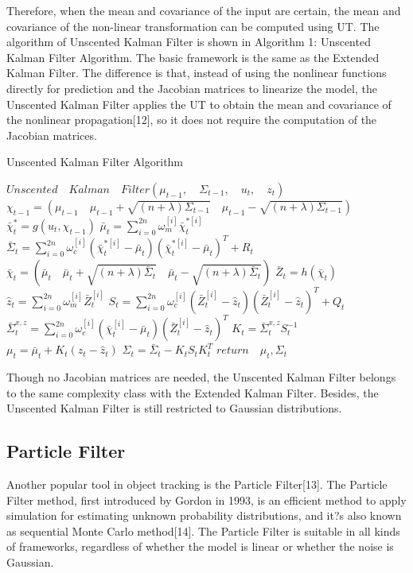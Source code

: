 \documentclass[10pt,twocolumn,letterpaper]{article}
\begin{document}
Therefore, when the mean and covariance of the input are certain, the mean and covariance of the non-linear transformation can be computed using UT. The algorithm of Unscented Kalman Filter is shown in Algorithm 1: Unscented Kalman Filter Algorithm. The basic framework is the same as the Extended Kalman Filter. The difference is that, instead of using the nonlinear functions directly for prediction and the Jacobian matrices to linearize the model, the Unscented Kalman Filter applies the UT to obtain the mean and covariance of the nonlinear propagation[12], so it does not require the computation of the Jacobian matrices.
\begin{algorithm}
\caption {Unscented Kalman Filter Algorithm}
\begin{algorithmic} [1]
\State  $Unscented\quad Kalman\quad Filter(\mu_{t-1},\quad \Sigma_{t-1},\quad u_t,\quad z_t)$
\State $\chi_{t-1}=(\mu_{t-1} \quad \mu_{t-1}+\sqrt{(n+\lambda)\Sigma_{t-1}} \quad \mu_{t-1}-\sqrt{(n+\lambda)\Sigma_{t-1}})$
\State $\bar\chi_t^*=g(u_t,\chi_{t-1})$
\State $\bar\mu_t=\sum_{i=0}^{2n} \omega_m^{[i]}\bar\chi_t^{*[i]}$
\State $\bar\Sigma_t=\sum_{i=0}^{2n} \omega_c^{[i]}(\bar\chi_t^{*[i]}-\bar\mu_t)(\bar\chi_t^{*[i]}-\bar\mu_t)^T+R_t$
\State $\bar\chi_t=(\bar\mu_t\quad \bar\mu_t+\sqrt{(n+\lambda)\bar\Sigma_t}\quad \bar\mu_t-\sqrt{(n+\lambda)\bar\Sigma_t})$
\State $\bar{Z}_t=h(\bar\chi_t)$
\State $\hat{z}_t=\sum_{i=0}^{2n} \omega_m^{[i]}\bar{Z}_t^{[i]}$
\State $S_t=\sum_{i=0}^{2n}  \omega_c^{[i]} (\bar{Z}_t^{[i]}-\hat{z}_t) (\bar{Z}_t^{[i]}-\hat{z}_t)^T+Q_t$
\State $\bar\Sigma_t^{x,z}=\sum_{i=0}^{2n} \omega_c^{[i]}(\bar\chi_t^{[i]}-\bar\mu_t)(\bar{Z}_t^{[i]}-\hat{z}_t)^T$
\State $K_t=\bar\Sigma_t^{x,z}S_t^{-1}$
\State $\mu_t=\bar\mu_t+K_t(z_t-\hat{z}_t)$
\State $\Sigma_t=\bar\Sigma_t-K_tS_tK_t^T$
\State $return\quad \mu_t,\Sigma_t$
\end{algorithmic}
\end{algorithm}

Though no Jacobian matrices are needed, the Unscented Kalman Filter belongs to the same complexity class with the Extended Kalman Filter. Besides, the Unscented Kalman Filter is still restricted to Gaussian distributions.

\subsection{Particle Filter}

Another popular tool in object tracking is the Particle Filter[13]. The Particle Filter method, first introduced by Gordon in 1993, is an efficient method to apply simulation for estimating unknown probability distributions, and it?s also known as sequential Monte Carlo method[14]. The Particle Filter is suitable in all kinds of frameworks, regardless of whether the model is linear or whether the noise is Gaussian. 
\end{document}
